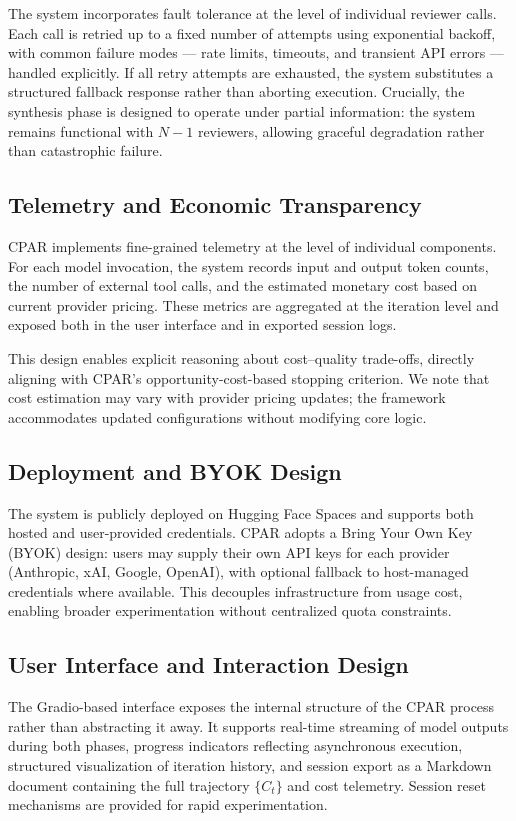 \documentclass[11pt, a4paper]{article}
\begin{document}
The system incorporates fault tolerance at the level of individual reviewer calls. Each call is retried up to a fixed number of attempts using exponential backoff, with common failure modes --- rate limits, timeouts, and transient API errors --- handled explicitly. If all retry attempts are exhausted, the system substitutes a structured fallback response rather than aborting execution. Crucially, the synthesis phase is designed to operate under partial information: the system remains functional with $N-1$ reviewers, allowing graceful degradation rather than catastrophic failure.

\subsection{Telemetry and Economic Transparency}

CPAR implements fine-grained telemetry at the level of individual components. For each model invocation, the system records input and output token counts, the number of external tool calls, and the estimated monetary cost based on current provider pricing. These metrics are aggregated at the iteration level and exposed both in the user interface and in exported session logs.

This design enables explicit reasoning about cost--quality trade-offs, directly aligning with CPAR's opportunity-cost-based stopping criterion. We note that cost estimation may vary with provider pricing updates; the framework accommodates updated configurations without modifying core logic.

\subsection{Deployment and BYOK Design}

The system is publicly deployed on Hugging Face Spaces and supports both hosted and user-provided credentials. CPAR adopts a Bring Your Own Key (BYOK) design: users may supply their own API keys for each provider (Anthropic, xAI, Google, OpenAI), with optional fallback to host-managed credentials where available. This decouples infrastructure from usage cost, enabling broader experimentation without centralized quota constraints.

\subsection{User Interface and Interaction Design}

The Gradio-based interface exposes the internal structure of the CPAR process rather than abstracting it away. It supports real-time streaming of model outputs during both phases, progress indicators reflecting asynchronous execution, structured visualization of iteration history, and session export as a Markdown document containing the full trajectory $\{C_t\}$ and cost telemetry. Session reset mechanisms are provided for rapid experimentation.
\end{document}
